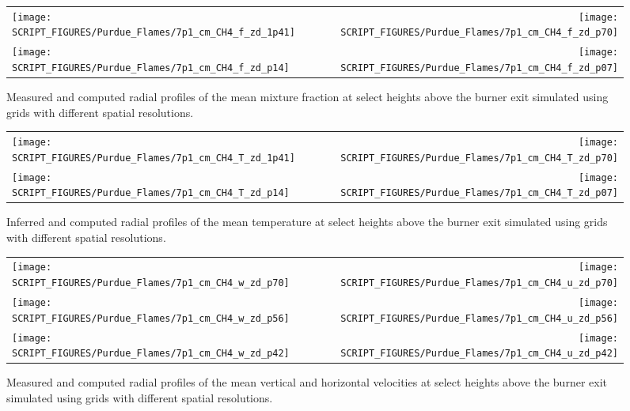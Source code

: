 \begin{figure}[p]
\begin{tabular*}{\textwidth}{l@{\extracolsep{\fill}}r}
\texttt{[image: SCRIPT\_FIGURES/Purdue\_Flames/7p1\_cm\_CH4\_f\_zd\_1p41]} &
\texttt{[image: SCRIPT\_FIGURES/Purdue\_Flames/7p1\_cm\_CH4\_f\_zd\_p70]} \\
\texttt{[image: SCRIPT\_FIGURES/Purdue\_Flames/7p1\_cm\_CH4\_f\_zd\_p14]} &
\texttt{[image: SCRIPT\_FIGURES/Purdue\_Flames/7p1\_cm\_CH4\_f\_zd\_p07]}
\end{tabular*}
\caption[Purdue 7.1 cm methane flame mean mixture fraction profiles]
{Measured \cite{Zhou:CS1998} and computed radial profiles of the mean mixture fraction at select heights above the burner exit simulated using grids with different spatial resolutions.}
\label{Purdue_7p1_CH4_mixture_fraction}
\end{figure}

\begin{figure}[p]
\begin{tabular*}{\textwidth}{l@{\extracolsep{\fill}}r}
\texttt{[image: SCRIPT\_FIGURES/Purdue\_Flames/7p1\_cm\_CH4\_T\_zd\_1p41]} &
\texttt{[image: SCRIPT\_FIGURES/Purdue\_Flames/7p1\_cm\_CH4\_T\_zd\_p70]} \\
\texttt{[image: SCRIPT\_FIGURES/Purdue\_Flames/7p1\_cm\_CH4\_T\_zd\_p14]} &
\texttt{[image: SCRIPT\_FIGURES/Purdue\_Flames/7p1\_cm\_CH4\_T\_zd\_p07]}
\end{tabular*}
\caption[Purdue 7.1 cm methane flame mean temperature profiles]
{Inferred \cite{Xin:CF2005} and computed radial profiles of the mean temperature at select heights above the burner exit simulated using grids with different spatial resolutions.}
\label{Purdue_7p1_CH4_temperature}
\end{figure}


\begin{figure}[p]
\begin{tabular*}{\textwidth}{l@{\extracolsep{\fill}}r}
\texttt{[image: SCRIPT\_FIGURES/Purdue\_Flames/7p1\_cm\_CH4\_w\_zd\_p70]} &
\texttt{[image: SCRIPT\_FIGURES/Purdue\_Flames/7p1\_cm\_CH4\_u\_zd\_p70]} \\
\texttt{[image: SCRIPT\_FIGURES/Purdue\_Flames/7p1\_cm\_CH4\_w\_zd\_p56]} &
\texttt{[image: SCRIPT\_FIGURES/Purdue\_Flames/7p1\_cm\_CH4\_u\_zd\_p56]} \\
\texttt{[image: SCRIPT\_FIGURES/Purdue\_Flames/7p1\_cm\_CH4\_w\_zd\_p42]} &
\texttt{[image: SCRIPT\_FIGURES/Purdue\_Flames/7p1\_cm\_CH4\_u\_zd\_p42]}
\end{tabular*}
\caption[Purdue 7.1 cm methane flame mean velocity profiles]
{Measured \cite{Zhou:CS1998} and computed radial profiles of the mean vertical and horizontal velocities at select heights above the burner exit simulated using grids with different spatial resolutions.}
\label{Purdue_7p1_CH4_vertical_velocity}
\end{figure}



